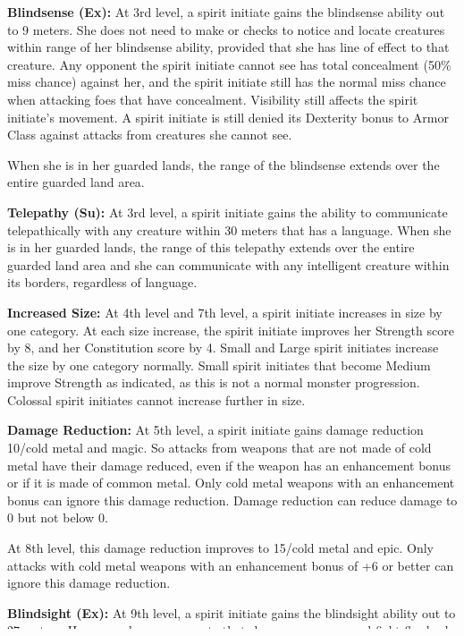 {\textbf{Blindsense (Ex):} At 3rd level, a spirit initiate gains the blindsense ability out to 9 meters. She does not need to make  or  checks to notice and locate creatures within range of her blindsense ability, provided that she has line of effect to that creature. Any opponent the spirit initiate cannot see has total concealment (50\% miss chance) against her, and the spirit initiate still has the normal miss chance when attacking foes that have concealment. Visibility still affects the spirit initiate's movement. A spirit initiate is still denied its Dexterity bonus to Armor Class against attacks from creatures she cannot see.

When she is in her guarded lands, the range of the blindsense extends over the entire guarded land area.

\textbf{Telepathy (Su):} At 3rd level, a spirit initiate gains the ability to communicate telepathically with any creature within 30 meters that has a language. When she is in her guarded lands, the range of this telepathy extends over the entire guarded land area and she can communicate with any intelligent creature within its borders, regardless of language.

\textbf{Increased Size:} At 4th level and 7th level, a spirit initiate increases in size by one category. At each size increase, the spirit initiate improves her Strength score by 8, and her Constitution score by 4. Small and Large spirit initiates increase the size by one category normally. Small spirit initiates that become Medium improve Strength as indicated, as this is not a normal monster progression. Colossal spirit initiates cannot increase further in size.

\textbf{Damage Reduction:} At 5th level, a spirit initiate gains damage reduction 10/cold metal and magic. So attacks from weapons that are not made of cold metal have their damage reduced, even if the weapon has an enhancement bonus or if it is made of common metal. Only cold metal weapons with an enhancement bonus can ignore this damage reduction. Damage reduction can reduce damage to 0 but not below 0. %

At 8th level, this damage reduction improves to 15/cold metal and epic. Only attacks with cold metal weapons with an enhancement bonus of +6 or better can ignore this damage reduction.

\textbf{Blindsight (Ex):} At 9th level, a spirit initiate gains the blindsight ability out to 27 meters. Her senses become so acute that she can maneuver and fight flawlessly even in total darkness. Invisibility, darkness, and most kinds of concealment are irrelevant, though the spirit initiate must have line of effect to a creature or object to discern it.

}
